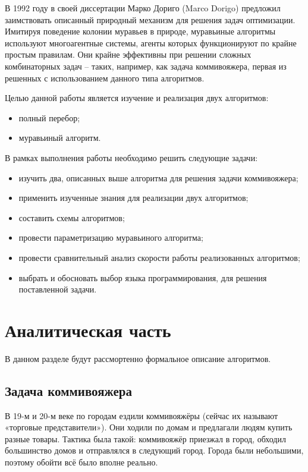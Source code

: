 \documentclass[12pt,a4paper]{report}
\begin{document}
В 1992 году в своей диссертации Марко Дориго (Marco Dorigo) предложил заимствовать описанный природный механизм для решения задач оптимизации. Имитируя поведение колонии муравьев в природе, муравьиные алгоритмы используют многоагентные системы, агенты которых функционируют по крайне простым правилам. Они крайне эффективны при решении сложных комбинаторных задач – таких, например, как задача коммивояжера, первая из решенных с использованием данного типа алгоритмов.


Целью данной работы является изучение и реализация двух алгоритмов:
\begin{itemize}
	\item полный перебор;
	\item муравьиный алгоритм.
\end{itemize}

В рамках выполнения работы необходимо решить следующие задачи:

\begin{itemize}
	\item изучить два, описанных выше алгоритма для решения задачи коммивояжера;
	\item применить изученные знания для реализации двух алгоритмов;
	\item составить схемы алгоритмов;
	\item провести параметризацию муравьиного алгоритма;
	\item провести сравнительный анализ скорости работы реализованных алгоритмов;
	\item выбрать и обосновать выбор языка программирования, для решения поставленной задачи.
\end{itemize}



\newpage
\chapter{Аналитическая часть}


В данном разделе будут рассмортенно формальное описание алгоритмов.

\section{Задача коммивояжера}

В 19-м и 20-м веке по городам ездили коммивояжёры (сейчас их называют «торговые представители»). Они ходили по домам и предлагали людям купить разные товары. Тактика была такой: коммивояжёр приезжал в город, обходил большинство домов и отправлялся в следующий город. Города были небольшими, поэтому обойти всё было вполне реально.
\end{document}
